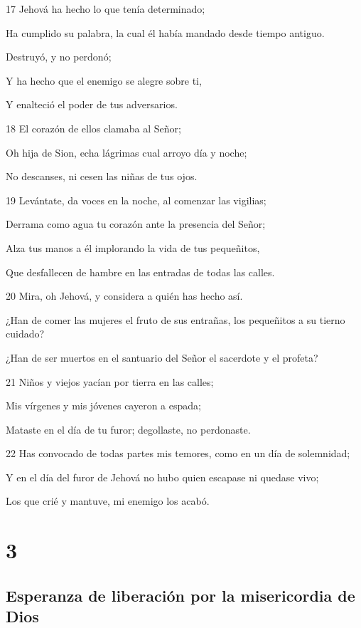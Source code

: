\par 17 Jehová ha hecho lo que tenía determinado; 
\par Ha cumplido su palabra, la cual él había mandado desde tiempo antiguo.
\par Destruyó, y no perdonó;
\par Y ha hecho que el enemigo se alegre sobre ti, 
\par Y enalteció el poder de tus adversarios.
\par 18 El corazón de ellos clamaba al Señor;
\par Oh hija de Sion, echa lágrimas cual arroyo día y noche;
\par No descanses, ni cesen las niñas de tus ojos.
\par 19 Levántate, da voces en la noche, al comenzar las vigilias;
\par Derrama como agua tu corazón ante la presencia del Señor;
\par Alza tus manos a él implorando la vida de tus pequeñitos,
\par Que desfallecen de hambre en las entradas de todas las calles.
\par 20 Mira, oh Jehová, y considera a quién has hecho así.
\par ¿Han de comer las mujeres el fruto de sus entrañas, los pequeñitos a su tierno cuidado?
\par ¿Han de ser muertos en el santuario del Señor el sacerdote y el profeta?
\par 21 Niños y viejos yacían por tierra en las calles;
\par Mis vírgenes y mis jóvenes cayeron a espada;
\par Mataste en el día de tu furor; degollaste, no perdonaste.
\par 22 Has convocado de todas partes mis temores, como en un día de solemnidad;
\par Y en el día del furor de Jehová no hubo quien escapase ni quedase vivo;
\par Los que crié y mantuve, mi enemigo los acabó.

\chapter{3}

\section*{Esperanza de liberación por la misericordia de Dios }

